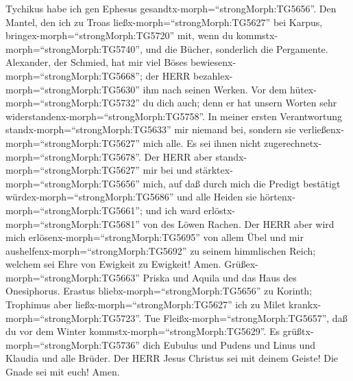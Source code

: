 Tychikus habe ich gen Ephesus gesandtx-morph=``strongMorph:TG5656''.
 Den Mantel, den ich zu Troas
ließx-morph=``strongMorph:TG5627'' bei Karpus,
bringex-morph=``strongMorph:TG5720'' mit, wenn du
kommstx-morph=``strongMorph:TG5740'', und die Bücher, sonderlich die
Pergamente.  Alexander, der Schmied, hat mir viel Böses
bewiesenx-morph=``strongMorph:TG5668''; der HERR
bezahlex-morph=``strongMorph:TG5630'' ihm nach seinen Werken.
 Vor dem hütex-morph=``strongMorph:TG5732'' du dich auch;
denn er hat unsern Worten sehr
widerstandenx-morph=``strongMorph:TG5758''.  In meiner
ersten Verantwortung standx-morph=``strongMorph:TG5633'' mir niemand
bei, sondern sie verließenx-morph=``strongMorph:TG5627'' mich alle. Es
sei ihnen nicht zugerechnetx-morph=``strongMorph:TG5678''. 
Der HERR aber standx-morph=``strongMorph:TG5627'' mir bei und
stärktex-morph=``strongMorph:TG5656'' mich, auf daß durch mich die
Predigt bestätigt würdex-morph=``strongMorph:TG5686'' und alle Heiden
sie hörtenx-morph=``strongMorph:TG5661''; und ich ward
erlöstx-morph=``strongMorph:TG5681'' von des Löwen Rachen. 
Der HERR aber wird mich erlösenx-morph=``strongMorph:TG5695'' von allem
Übel und mir aushelfenx-morph=``strongMorph:TG5692'' zu seinem
himmlischen Reich; welchem sei Ehre von Ewigkeit zu Ewigkeit! Amen.
 Grüßex-morph=``strongMorph:TG5663'' Priska und Aquila und
das Haus des Onesiphorus.  Erastus
bliebx-morph=``strongMorph:TG5656'' zu Korinth; Trophimus aber
ließx-morph=``strongMorph:TG5627'' ich zu Milet
krankx-morph=``strongMorph:TG5723''.  Tue
Fleißx-morph=``strongMorph:TG5657'', daß du vor dem Winter
kommstx-morph=``strongMorph:TG5629''. Es
grüßtx-morph=``strongMorph:TG5736'' dich Eubulus und Pudens und Linus
und Klaudia und alle Brüder.  Der HERR Jesus Christus sei
mit deinem Geiste! Die Gnade sei mit euch! Amen.
